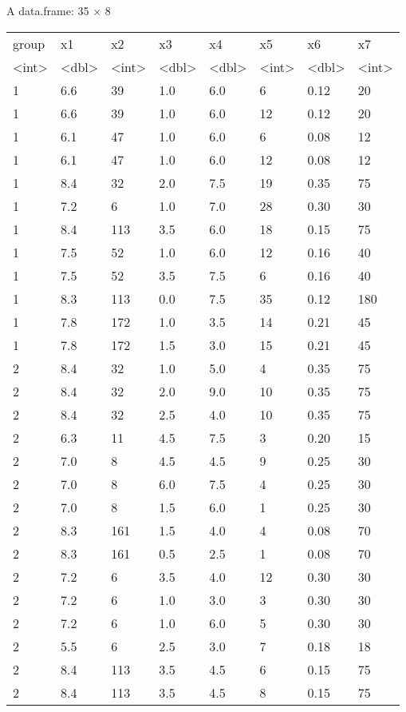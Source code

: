 \documentclass[11pt]{article}
\begin{document}
    A data.frame: 35 × 8
\begin{tabular}{llllllll}
 group & x1 & x2 & x3 & x4 & x5 & x6 & x7\\
 <int> & <dbl> & <int> & <dbl> & <dbl> & <int> & <dbl> & <int>\\
\hline
	 1 & 6.6 &  39 & 1.0 & 6.0 &  6 & 0.12 &  20\\
	 1 & 6.6 &  39 & 1.0 & 6.0 & 12 & 0.12 &  20\\
	 1 & 6.1 &  47 & 1.0 & 6.0 &  6 & 0.08 &  12\\
	 1 & 6.1 &  47 & 1.0 & 6.0 & 12 & 0.08 &  12\\
	 1 & 8.4 &  32 & 2.0 & 7.5 & 19 & 0.35 &  75\\
	 1 & 7.2 &   6 & 1.0 & 7.0 & 28 & 0.30 &  30\\
	 1 & 8.4 & 113 & 3.5 & 6.0 & 18 & 0.15 &  75\\
	 1 & 7.5 &  52 & 1.0 & 6.0 & 12 & 0.16 &  40\\
	 1 & 7.5 &  52 & 3.5 & 7.5 &  6 & 0.16 &  40\\
	 1 & 8.3 & 113 & 0.0 & 7.5 & 35 & 0.12 & 180\\
	 1 & 7.8 & 172 & 1.0 & 3.5 & 14 & 0.21 &  45\\
	 1 & 7.8 & 172 & 1.5 & 3.0 & 15 & 0.21 &  45\\
	 2 & 8.4 &  32 & 1.0 & 5.0 &  4 & 0.35 &  75\\
	 2 & 8.4 &  32 & 2.0 & 9.0 & 10 & 0.35 &  75\\
	 2 & 8.4 &  32 & 2.5 & 4.0 & 10 & 0.35 &  75\\
	 2 & 6.3 &  11 & 4.5 & 7.5 &  3 & 0.20 &  15\\
	 2 & 7.0 &   8 & 4.5 & 4.5 &  9 & 0.25 &  30\\
	 2 & 7.0 &   8 & 6.0 & 7.5 &  4 & 0.25 &  30\\
	 2 & 7.0 &   8 & 1.5 & 6.0 &  1 & 0.25 &  30\\
	 2 & 8.3 & 161 & 1.5 & 4.0 &  4 & 0.08 &  70\\
	 2 & 8.3 & 161 & 0.5 & 2.5 &  1 & 0.08 &  70\\
	 2 & 7.2 &   6 & 3.5 & 4.0 & 12 & 0.30 &  30\\
	 2 & 7.2 &   6 & 1.0 & 3.0 &  3 & 0.30 &  30\\
	 2 & 7.2 &   6 & 1.0 & 6.0 &  5 & 0.30 &  30\\
	 2 & 5.5 &   6 & 2.5 & 3.0 &  7 & 0.18 &  18\\
	 2 & 8.4 & 113 & 3.5 & 4.5 &  6 & 0.15 &  75\\
	 2 & 8.4 & 113 & 3.5 & 4.5 &  8 & 0.15 &  75\\

\end{tabular}
\end{document}
